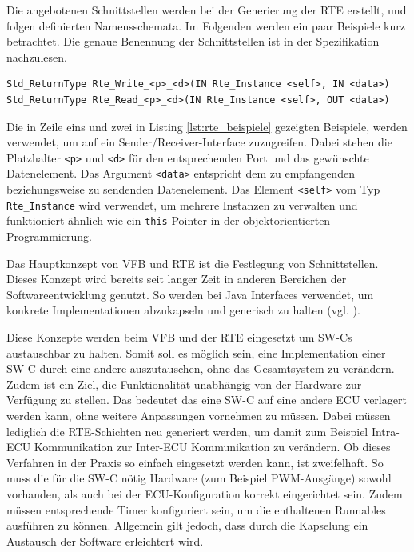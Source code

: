 \documentclass[
  a4paper,					    %
  twoside,
  DIV=calc,     				%
  bibliography=totoc,
  cleardoublepage=empty,
  ngerman,     					%
  final       					%
]{scrbook}
\begin{document}
Die angebotenen Schnittstellen werden bei der Generierung der RTE erstellt, und folgen definierten Namensschemata. Im Folgenden werden ein paar Beispiele kurz betrachtet. Die genaue Benennung der Schnittstellen ist in der Spezifikation nachzulesen.

\begin{lstlisting}[frame=single, basicstyle=\footnotesize, caption={RTE Beispiele}, label={lst:rte_beispiele}]
Std_ReturnType Rte_Write_<p>_<d>(IN Rte_Instance <self>, IN <data>)
Std_ReturnType Rte_Read_<p>_<d>(IN Rte_Instance <self>, OUT <data>)
\end{lstlisting}

Die in Zeile eins und zwei in Listing \ref{lst:rte_beispiele} gezeigten Beispiele, werden verwendet, um auf ein Sender/Receiver-Interface zuzugreifen. Dabei stehen die Platzhalter \texttt{<p>} und \texttt{<d>} für den entsprechenden Port und das gewünschte Datenelement. Das Argument \texttt{<data>} entspricht dem zu empfangenden beziehungsweise zu sendenden Datenelement. Das Element \texttt{<self>} vom Typ \texttt{Rte\_Instance} wird verwendet, um mehrere Instanzen zu verwalten und funktioniert ähnlich wie ein \texttt{this}-Pointer in der objektorientierten Programmierung.

Das Hauptkonzept von VFB und RTE ist die Festlegung von Schnittstellen. Dieses Konzept wird bereits seit langer Zeit in anderen Bereichen der Softwareentwicklung genutzt. So werden bei Java Interfaces verwendet, um konkrete Implementationen abzukapseln und generisch zu halten (vgl. \cite{objektorientierung}).

Diese Konzepte werden beim VFB und der RTE eingesetzt um SW-Cs austauschbar zu halten. Somit soll es möglich sein, eine Implementation einer SW-C durch eine andere auszutauschen, ohne das Gesamtsystem zu verändern. Zudem ist ein Ziel, die Funktionalität unabhängig von der Hardware zur Verfügung zu stellen. Das bedeutet das eine SW-C auf eine andere ECU verlagert werden kann, ohne weitere Anpassungen vornehmen zu müssen. Dabei müssen lediglich die RTE-Schichten neu generiert werden, um damit zum Beispiel Intra-ECU Kommunikation zur Inter-ECU Kommunikation zu verändern. Ob dieses Verfahren in der Praxis so einfach eingesetzt werden kann, ist zweifelhaft. So muss die für die SW-C nötig Hardware (zum Beispiel PWM-Ausgänge) sowohl vorhanden, als auch bei der ECU-Konfiguration korrekt eingerichtet sein. Zudem müssen entsprechende Timer konfiguriert sein, um die enthaltenen Runnables ausführen zu können. Allgemein gilt jedoch, dass durch die Kapselung ein Austausch der Software erleichtert wird.
\end{document}
